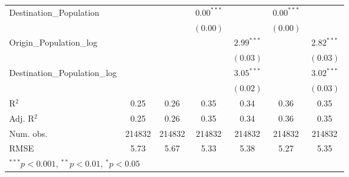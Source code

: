 \begin{table}
\begin{center}
\begin{tabular}{l c c c c c c }
			Destination\_Population      &               &               & $0.00^{***}$  &                & $0.00^{***}$  &                \\
			&               &               & $(0.00)$      &                & $(0.00)$      &                \\
			Origin\_Population\_log      &               &               &               & $2.99^{***}$   &               & $2.82^{***}$   \\
			&               &               &               & $(0.03)$       &               & $(0.03)$       \\
			Destination\_Population\_log &               &               &               & $3.05^{***}$   &               & $3.02^{***}$   \\
			&               &               &               & $(0.02)$       &               & $(0.03)$       \\
			\hline
			R$^2$                        & 0.25          & 0.26          & 0.35          & 0.34           & 0.36          & 0.35           \\
			Adj. R$^2$                   & 0.25          & 0.26          & 0.35          & 0.34           & 0.36          & 0.35           \\
			Num. obs.                    & 214832        & 214832        & 214832        & 214832         & 214832        & 214832         \\
			RMSE                         & 5.73          & 5.67          & 5.33          & 5.38           & 5.27          & 5.35           \\
			\hline
			\multicolumn{7}{l}{\scriptsize{$^{***}p<0.001$, $^{**}p<0.01$, $^*p<0.05$}}
		\end{tabular}
		\label{table:GravityModel2017Q4}
	\end{center}
\end{table}



